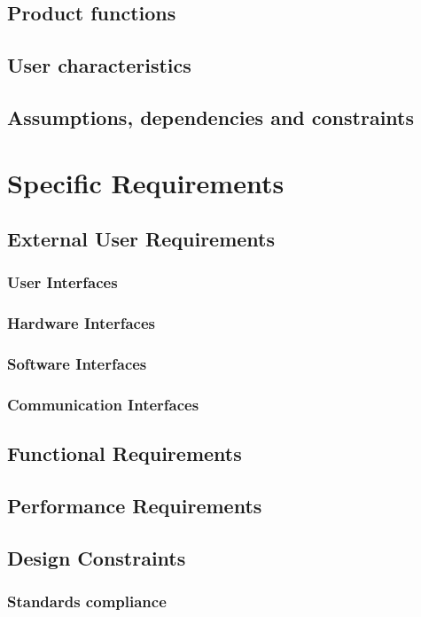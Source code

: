 \documentclass[12pt]{article}
\begin{document}
    \subsection{Product functions}
    \subsection{User characteristics}
    \subsection{Assumptions, dependencies and constraints}
    
\newpage
\section{Specific Requirements}
    \subsection{External User Requirements}
        \subsubsection{User Interfaces}
        \subsubsection{Hardware Interfaces}
        \subsubsection{Software Interfaces}
        \subsubsection{Communication Interfaces}
    \subsection{Functional Requirements}
    \subsection{Performance Requirements}
    \subsection{Design Constraints}
        \subsubsection{Standards compliance}
\end{document}
